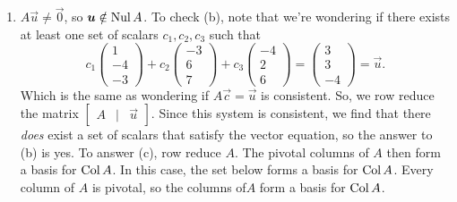\begin{enumerate}
\begin{figure}[!h]
\begin{minipage}{0.33\textwidth}
				\caption{\(\colspace A\).}
			\end{minipage}\hfill
			\begin{minipage}{0.33\textwidth}
				\centering
				\caption{Solutions to \(A\vec{x} = \vec{b}\).}
			\end{minipage}
		\end{figure}

	\item[\textbf{Q10}] \(A\vec{u} \ne \vec{0}\), so \(\bm{u} \notin \operatorname{Nul} A\). To check (b), note that we're wondering if there exists at least one set of 
		scalars \(c_1, c_2, c_3\) such that \[c_1\begin{pmatrix}1 \\ -4 \\ -3\end{pmatrix} + c_2\begin{pmatrix}-3 \\ 6 \\ 7\end{pmatrix} + c_3\begin{pmatrix}-4 \\ 2 \\ 6\end{pmatrix} = \begin{pmatrix}3 \\ 3 \\ -4\end{pmatrix} = \vec{u}.\] Which is the same as wondering if \(A\vec{c} = \vec{u}\) is
		consistent. So, we row reduce the matrix \(\begin{bmatrix}A & | & \vec{u}\end{bmatrix}\). Since this system is consistent, we find that there
		\emph{does} exist a set of scalars that satisfy the vector equation, so the answer to (b) is yes. To answer (c), row reduce \(A\). The pivotal columns
		of \(A\) then form a basis for \(\colspace A\). In this case, the set below forms a basis for \(\colspace A\). Every column of \(A\) is pivotal, so the 
		columns of\(A\) form a basis for \(\colspace A\).


\end{enumerate}
